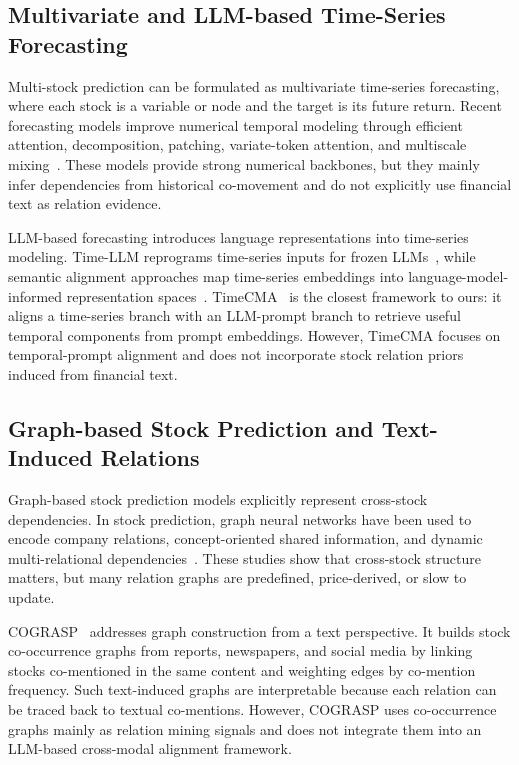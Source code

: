 \documentclass[runningheads]{llncs}
\begin{document}
\subsection{Multivariate and LLM-based Time-Series Forecasting}

Multi-stock prediction can be formulated as multivariate time-series forecasting, where each stock is a variable or node and the target is its future return. Recent forecasting models improve numerical temporal modeling through efficient attention, decomposition, patching, variate-token attention, and multiscale mixing~\cite{zhou2021informer,wu2021autoformer,nie2022patchtst,liu2023itransformer,wang2024timemixer}. These models provide strong numerical backbones, but they mainly infer dependencies from historical co-movement and do not explicitly use financial text as relation evidence.

LLM-based forecasting introduces language representations into time-series modeling. Time-LLM reprograms time-series inputs for frozen LLMs~\cite{jin2023timellm}, while semantic alignment approaches map time-series embeddings into language-model-informed representation spaces~\cite{pan2024sip}. TimeCMA~\cite{liu2025timecma} is the closest framework to ours: it aligns a time-series branch with an LLM-prompt branch to retrieve useful temporal components from prompt embeddings. However, TimeCMA focuses on temporal-prompt alignment and does not incorporate stock relation priors induced from financial text.

\subsection{Graph-based Stock Prediction and Text-Induced Relations}

Graph-based stock prediction models explicitly represent cross-stock dependencies. In stock prediction, graph neural networks have been used to encode company relations, concept-oriented shared information, and dynamic multi-relational dependencies~\cite{xu2021hist,qian2024mdgnn,xia2024cisthpan}. These studies show that cross-stock structure matters, but many relation graphs are predefined, price-derived, or slow to update.

COGRASP~\cite{li2025cograsp} addresses graph construction from a text perspective. It builds stock co-occurrence graphs from reports, newspapers, and social media by linking stocks co-mentioned in the same content and weighting edges by co-mention frequency. Such text-induced graphs are interpretable because each relation can be traced back to textual co-mentions. However, COGRASP uses co-occurrence graphs mainly as relation mining signals and does not integrate them into an LLM-based cross-modal alignment framework.
\end{document}
